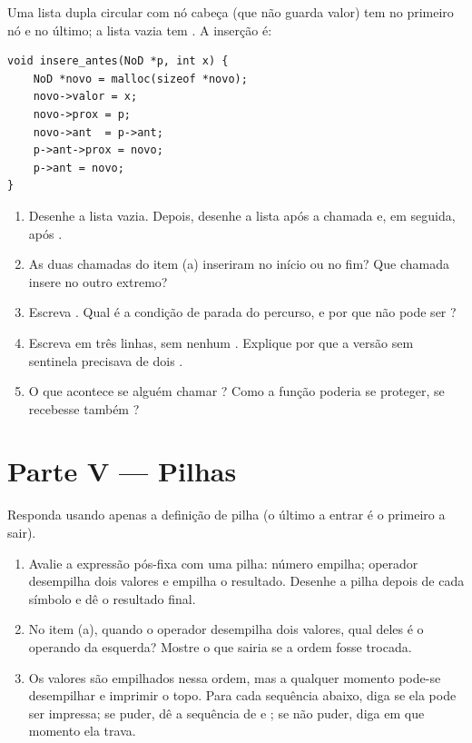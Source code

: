 \documentclass[11pt,a4paper]{article}
\begin{document}
Uma lista dupla circular com nó cabeça  (que não guarda valor) tem
 no primeiro nó e  no último; a lista vazia tem
. A inserção é:

\begin{lstlisting}
void insere_antes(NoD *p, int x) {
    NoD *novo = malloc(sizeof *novo);
    novo->valor = x;
    novo->prox = p;
    novo->ant  = p->ant;
    p->ant->prox = novo;
    p->ant = novo;
}
\end{lstlisting}

\begin{enumerate}[label=(\alph*),leftmargin=1.8em,itemsep=1pt]
  \item Desenhe a lista vazia. Depois, desenhe a lista após a chamada
         e, em seguida, após .
  \item As duas chamadas do item (a) inseriram no início ou no fim? Que chamada
        insere no outro extremo?
  \item Escreva . Qual é a condição de parada do
        percurso, e por que não pode ser ?
  \item Escreva  em três linhas, sem nenhum .
        Explique por que a versão sem sentinela precisava de dois .
  \item O que acontece se alguém chamar ? Como a função
        poderia se proteger, se recebesse também ?
\end{enumerate}

\section{Parte V --- Pilhas}

Responda usando apenas a definição de pilha (o último a entrar é o primeiro a sair).

\begin{enumerate}[label=(\alph*),leftmargin=1.8em,itemsep=1pt]
  \item Avalie a expressão pós-fixa  com uma pilha: número
        empilha; operador desempilha dois valores e empilha o resultado. Desenhe a
        pilha depois de cada símbolo e dê o resultado final.
  \item No item (a), quando o operador \cd{-} desempilha dois valores, qual deles é
        o operando da esquerda? Mostre o que sairia se a ordem fosse trocada.
  \item Os valores  são empilhados nessa ordem, mas a qualquer momento
        pode-se desempilhar e imprimir o topo. Para cada sequência abaixo, diga se
        ela pode ser impressa; se puder, dê a sequência de  e
        ; se não puder, diga em que momento ela trava.\\[2pt]
         \qquad {} \qquad {} \qquad {}
\end{enumerate}
\end{document}

